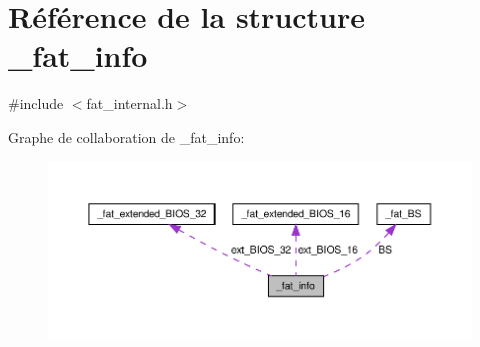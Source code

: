 \hypertarget{struct__fat__info}{\section{Référence de la structure \-\_\-fat\-\_\-info}
\label{struct__fat__info}
}


{\ttfamily \#include $<$fat\-\_\-internal.\-h$>$}



Graphe de collaboration de \-\_\-fat\-\_\-info\-:
\nopagebreak
\begin{figure}[H]
\begin{center}
\leavevmode
\includegraphics[width=350pt]{struct__fat__info__coll__graph}
\end{center}
\end{figure}
